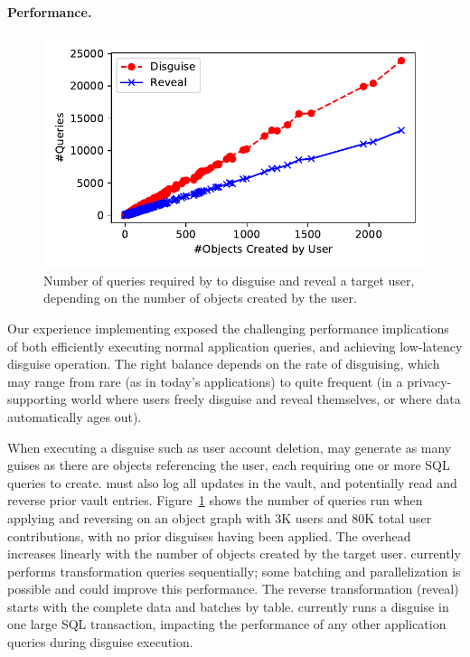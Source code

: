 \paragraph{Performance.}
\label{sec:perf}

\begin{figure}[t!]
    \centerline{\includegraphics[width=.5\textwidth]{img/perf}}
    \vspace{-\baselineskip}
    \caption{Number of queries required by \lrtbf to disguise and reveal a target user, depending on the number of
    objects created by the user.}
    \label{fig:latencies}
    \vspace{-\baselineskip}
\end{figure}

Our experience implementing \sys exposed the challenging performance implications of both efficiently
executing normal application queries, and achieving low-latency disguise operation. The right
balance depends on the rate of disguising, which may range from rare (as in today's applications)
to quite frequent (in a privacy-supporting world where users freely disguise and reveal themselves,
or where data automatically ages out).

%
When executing a disguise such as user account deletion, \sys may generate as many guises as there are
objects referencing the user, each requiring one or more SQL queries to create. \sys must also
log all updates in the vault, and potentially read and reverse prior vault entries.
%
Figure~\ref{fig:latencies} shows the number of queries run when applying and reversing
\lrtbf on an object graph with 3K users and 80K total user contributions, with no prior
disguises having been applied.
%
The overhead increases linearly with the number of objects created by the target user.  \sys
currently performs transformation queries sequentially; some batching and parallelization is
possible and could improve this performance.
%
The reverse transformation (reveal) starts with the complete data and batches by table.
%
\sys currently runs a disguise in one large SQL transaction, impacting the performance of any other
application queries during disguise execution.

